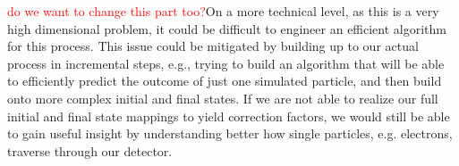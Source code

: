 \documentclass{article}
\begin{document}
\quad \textcolor{red}{do we want to change this part too?}On a more technical level, as this is a very high dimensional problem, it could be difficult to engineer an efficient algorithm for this process. This issue could be mitigated by building up to our actual process in incremental steps, e.g., trying to build an algorithm that will be able to efficiently predict the outcome of just one simulated particle, and then build onto more complex initial and final states. If we are not able to realize our full initial and final state mappings to yield correction factors, we would still be able to gain useful insight by understanding better how single particles, e.g. electrons, traverse through our detector. 





 
\end{document}
